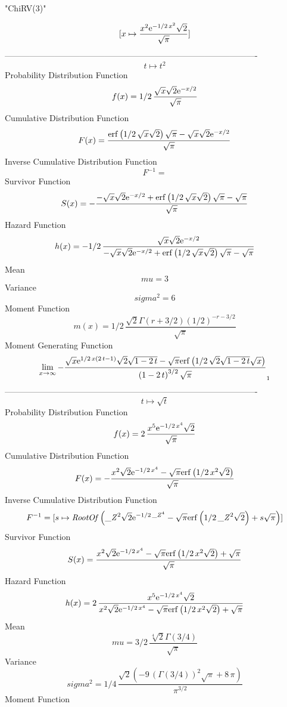 \documentclass[12pt]{article}
\begin{document}
 
                                 "ChiRV(3)"

$$[x\mapsto {\frac {{x}^{2}{{\rm e}^{-1/2\,{x}^{2}}}\sqrt {2}}{\sqrt {
\pi}}}]
$$-------------------------------------------------------------------------------------------  \\$$t\mapsto {t}^{2}
$$Probability Distribution Function 
$$  f(x)=1/2\,{\frac {\sqrt {x}\sqrt {2}{{\rm e}^{-x/2}}}{\sqrt {\pi}}}
$$Cumulative Distribution Function  
 $$F(x)={\frac {{\rm erf} \left(1/2\,\sqrt {x}\sqrt {2}\right)\sqrt {\pi}-
\sqrt {x}\sqrt {2}{{\rm e}^{-x/2}}}{\sqrt {\pi}}}
$$ Inverse Cumulative Distribution Function 
  $$F^{-1} = $$Survivor Function 
 $$ S(x)=-{\frac {-\sqrt {x}\sqrt {2}{{\rm e}^{-x/2}}+{\rm erf} \left(1/2\,
\sqrt {x}\sqrt {2}\right)\sqrt {\pi}-\sqrt {\pi}}{\sqrt {\pi}}}
$$ Hazard Function 
 $$ h(x)=-1/2\,{\frac {\sqrt {x}\sqrt {2}{{\rm e}^{-x/2}}}{-\sqrt {x}\sqrt {2}{
{\rm e}^{-x/2}}+{\rm erf} \left(1/2\,\sqrt {x}\sqrt {2}\right)\sqrt {
\pi}-\sqrt {\pi}}}
$$Mean 
 $$ mu=3
$$ Variance 
 $$ sigma^2 = 6
$$Moment Function 
 $$ m(x) = 1/2\,{\frac {\sqrt {2}\Gamma \left( r+3/2 \right)  \left( 1/2 \right) 
^{-r-3/2}}{\sqrt {\pi}}}
$$ Moment Generating Function 
 $$\lim _{x\rightarrow \infty }-{\frac {\sqrt {x}{{\rm e}^{1/2\,x \left( 
2\,t-1 \right) }}\sqrt {2}\sqrt {1-2\,t}-\sqrt {\pi}{\rm erf} \left(1/
2\,\sqrt {2}\sqrt {1-2\,t}\sqrt {x}\right)}{ \left( 1-2\,t \right) ^{3
/2}\sqrt {\pi}}}_{{1}}
$$-------------------------------------------------------------------------------------------  \\$$t\mapsto \sqrt {t}
$$Probability Distribution Function 
$$  f(x)=2\,{\frac {{x}^{5}{{\rm e}^{-1/2\,{x}^{4}}}\sqrt {2}}{\sqrt {\pi}}}
$$Cumulative Distribution Function  
 $$F(x)=-{\frac {{x}^{2}\sqrt {2}{{\rm e}^{-1/2\,{x}^{4}}}-\sqrt {\pi}
{\rm erf} \left(1/2\,{x}^{2}\sqrt {2}\right)}{\sqrt {\pi}}}
$$ Inverse Cumulative Distribution Function 
  $$F^{-1} = [s\mapsto {\it RootOf} \left( {{\it \_Z}}^{2}\sqrt {2}{{\rm e}^{-1/2\,
{{\it \_Z}}^{4}}}-\sqrt {\pi}{\rm erf} \left(1/2\,{{\it \_Z}}^{2}
\sqrt {2}\right)+s\sqrt {\pi} \right) ]
$$Survivor Function 
 $$ S(x)={\frac {{x}^{2}\sqrt {2}{{\rm e}^{-1/2\,{x}^{4}}}-\sqrt {\pi}{\rm erf}
 \left(1/2\,{x}^{2}\sqrt {2}\right)+\sqrt {\pi}}{\sqrt {\pi}}}
$$ Hazard Function 
 $$ h(x)=2\,{\frac {{x}^{5}{{\rm e}^{-1/2\,{x}^{4}}}\sqrt {2}}{{x}^{2}\sqrt {2}
{{\rm e}^{-1/2\,{x}^{4}}}-\sqrt {\pi}{\rm erf} \left(1/2\,{x}^{2}
\sqrt {2}\right)+\sqrt {\pi}}}
$$Mean 
 $$ mu=3/2\,{\frac {\sqrt [4]{2}\Gamma \left( 3/4 \right) }{\sqrt {\pi}}}
$$ Variance 
 $$ sigma^2 = 1/4\,{\frac {\sqrt {2} \left( -9\, \left( \Gamma \left( 3/4 \right) 
 \right) ^{2}\sqrt {\pi}+8\,\pi \right) }{{\pi}^{3/2}}}
$$Moment Function 
\end{document}
